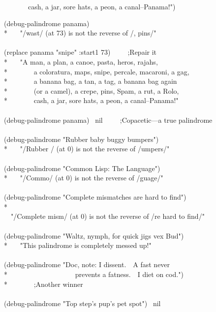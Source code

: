 \begin{newer}
\begin{lisp}
~~~~~~~cash, a jar, sore hats, a peon, a canal--Panama!")
\end{lisp}
\begin{lisp}
(debug-palindrome panama) \\*
~~\EV\ "/wast/ (at 73) is not the reverse of /, pins/" \\
\\
(replace panama "snipe" :start1 73)~~~~~;{\rm Repair it} \\*
~~\EV\ "A man, a plan, a canoe, pasta, heros, rajahs, \\*
~~~~~~~a coloratura, maps, snipe, percale, macaroni, a gag, \\*
~~~~~~~a banana bag, a tan, a tag, a banana bag again \\*
~~~~~~~(or a camel), a crepe, pins, Spam, a rut, a Rolo, \\*
~~~~~~~cash, a jar, sore hats, a peon, a canal--Panama!" \\
\\
(debug-palindrome panama) \EV\ nil~~~~~;{\rm Copacetic---a true palindrome} \\
\\
(debug-palindrome "Rubber baby buggy bumpers") \\*
~~\EV\ "/Rubber / (at 0) is not the reverse of /umpers/" \\
\\
(debug-palindrome "Common Lisp: The Language") \\*
~~\EV\ "/Commo/ (at 0) is not the reverse of /guage/" \\
\\
(debug-palindrome "Complete mismatches are hard to find") \\*
~~\EV\ \\
~~"/Complete mism/ (at 0) is not the reverse of /re hard to find/" \\
\\
(debug-palindrome "Waltz, nymph, for quick jigs vex Bud") \\*
~~\EV\ "This palindrome is completely messed up!" \\
\\
(debug-palindrome "Doc, note: I dissent.~~A fast never \\*
~~~~~~~~~~~~~~~~~~~prevents a fatness.~~I diet on cod.") \\*
~~\EV\nil~~~~~;{\rm Another winner} \\
\\
(debug-palindrome "Top step's pup's pet spot") \EV\ nil
\end{lisp}
\end{newer}

